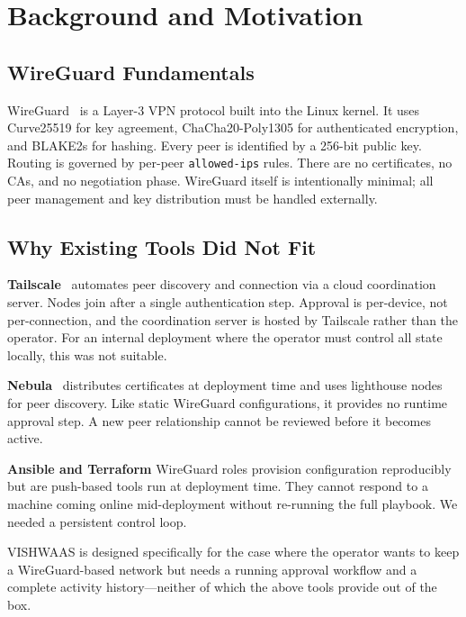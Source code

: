 \documentclass[conference]{IEEEtran}
\begin{document}
\section{Background and Motivation}
\label{sec:background}

\subsection{WireGuard Fundamentals}

WireGuard~\cite{donenfeld2017wireguard} is a Layer-3 VPN protocol built
into the Linux kernel. It uses Curve25519 for key agreement,
ChaCha20-Poly1305 for authenticated encryption, and BLAKE2s for hashing.
Every peer is identified by a 256-bit public key. Routing is governed by
per-peer \texttt{allowed-ips} rules. There are no certificates, no CAs,
and no negotiation phase. WireGuard itself is intentionally minimal;
all peer management and key distribution must be handled externally.

\subsection{Why Existing Tools Did Not Fit}

\textbf{Tailscale}~\cite{tailscale} automates peer discovery and connection
via a cloud coordination server. Nodes join after a single authentication
step. Approval is per-device, not per-connection, and the coordination server
is hosted by Tailscale rather than the operator. For an internal deployment
where the operator must control all state locally, this was not suitable.

\textbf{Nebula}~\cite{nebula} distributes certificates at deployment time and
uses lighthouse nodes for peer discovery. Like static WireGuard configurations,
it provides no runtime approval step. A new peer relationship cannot be
reviewed before it becomes active.

\textbf{Ansible and Terraform} WireGuard roles provision configuration
reproducibly but are push-based tools run at deployment time. They cannot
respond to a machine coming online mid-deployment without re-running the
full playbook. We needed a persistent control loop.

VISHWAAS is designed specifically for the case where the operator wants
to keep a WireGuard-based network but needs a running approval workflow
and a complete activity history---neither of which the above tools provide
out of the box.
\end{document}
